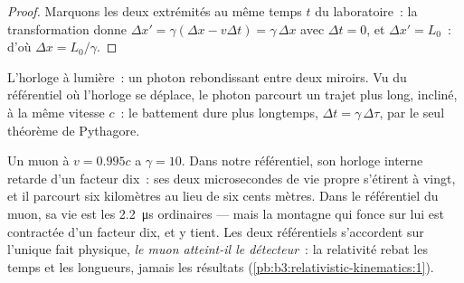 \begin{proof}
Marquons les deux extrémités au même temps $t$ du laboratoire~: la
transformation donne $\Delta x' = \gamma(\Delta x - v\Delta t) = \gamma\,\Delta x$ avec
$\Delta t = 0$, et $\Delta x' = L_0$~: d'où $\Delta x = L_0/\gamma$.
\end{proof}

\begin{omfigure}

{\small L'horloge à lumière~: un photon rebondissant entre deux
miroirs. Vu du référentiel où l'horloge se déplace, le photon parcourt
un trajet plus long, incliné, à la même vitesse $c$~: le battement dure
plus longtemps, $\Delta t = \gamma\,\Delta\tau$, par le seul théorème
de Pythagore.}
\end{omfigure}

\begin{example}\label{ex:b3:relativistic-kinematics:muon}
Un muon à $v = 0.995c$ a $\gamma = 10$. Dans notre référentiel, son
horloge interne retarde d'un facteur dix~: ses deux microsecondes de
vie propre s'étirent à vingt, et il parcourt six kilomètres au lieu de
six cents mètres. Dans le référentiel du muon, sa vie est les
\qty{2.2}{\micro s} ordinaires --- mais la montagne qui fonce sur lui
est contractée d'un facteur dix, et y tient. Les deux référentiels
s'accordent sur l'unique fait physique, \emph{le muon atteint-il le
détecteur}~: la relativité rebat les temps et les longueurs, jamais les
résultats (\cref{pb:b3:relativistic-kinematics:1}).
\end{example}

